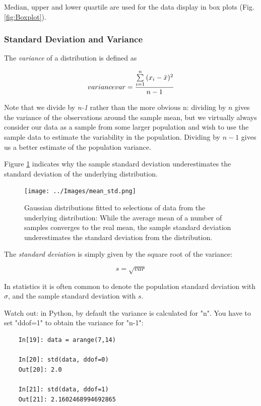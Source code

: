 Median, upper and lower quartile are used for the data display in box plots (Fig.\ref{fig:Boxplot}).

\subsubsection{Standard Deviation and Variance}
The \emph{variance} of a distribution is defined as

\begin{equation}\label{eq_variance} \index{general}{variance}
  var = \frac{{\sum\limits_{i = 1}^n {({x_i-\bar{x}})^2} }}{n-1}
\end{equation}

Note that we divide by \emph{n-1} rather than the more obvious n: dividing by $n$ gives the variance of the observations around the sample mean, but we virtually always consider our data as a sample from some larger population and wish to use the sample data to estimate the variability in the population. Dividing by $n-1$ gives us a better estimate of the population variance.

Figure \ref{fig:mean_std} indicates why the sample standard deviation underestimates the standard deviation of the underlying distribution.

\begin{figure}[ht]
  \centering
  \texttt{[image: ../Images/mean\_std.png]}\\
  \caption{Gaussian distributions fitted to selections of data from the underlying distribution: While the average mean of a number of samples converges to the real mean, the sample standard deviation underestimates the standard deviation from the distribution.}\label{fig:mean_std}
\end{figure}

The \emph{standard deviation}  is simply given by the square root of the variance:

\begin{equation}
  s = \sqrt{var}
\end{equation}

In statistics it is often common to denote the population standard deviation with $\sigma$, and the sample standard deviation with $s$.

Watch out: in Python, by default the variance is calculated for "n". You have to set "ddof=1" to obtain the variance for "n-1":

\begin{lstlisting}
    In[19]: data = arange(7,14)

    In[20]: std(data, ddof=0)
    Out[20]: 2.0

    In[21]: std(data, ddof=1)
    Out[21]: 2.1602468994692865
\end{lstlisting}

